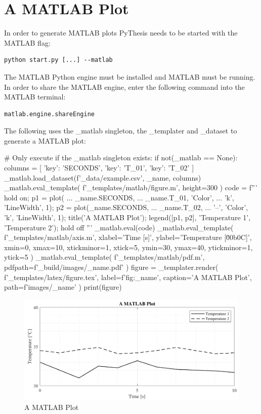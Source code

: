 \documentclass[a4paper]{book}
\begin{document}
\section{A MATLAB Plot}
\label{sec:a-matlab-plot}
In order to generate MATLAB plots PyThesis needs to be started with the MATLAB flag:
\begin{verbatim}
python start.py [...] --matlab
\end{verbatim}
The MATLAB Python engine must be installed and MATLAB must be running. In order to share the MATLAB engine, enter the following command into the MATLAB terminal:
\begin{verbatim}
matlab.engine.shareEngine
\end{verbatim}
The following uses the \_matlab singleton, the \_templater and \_dataset to generate a MATLAB plot:  
\begin{python}
# Only execute if the _matlab singleton exists:
if not(_matlab == None):
    columns = [
        {'key': 'SECONDS'},
        {'key': 'T_01'},
        {'key': 'T_02'}
    ]
    _matlab.load_dataset(f'{_data}/example.csv', _name, columns)
    _matlab.eval_template(
        f'{_templates}/matlab/figure.m',
        height=300
    )
    code = f'''
        hold on;
        p1 = plot( ...
            {_name}.SECONDS, ...
            {_name}.T_01, 'Color',  ...
            'k', 'LineWidth', 1);
        p2 = plot({_name}.SECONDS, ...
            {_name}.T_02, ...
            '--', 'Color', 'k', 'LineWidth', 1);
        title('A MATLAB Plot');
        legend([p1, p2], 'Temperature 1', 'Temperature 2');
        hold off
    '''
    _matlab.eval(code)
    _matlab.eval_template(
        f'{_templates}/matlab/axis.m',
        xlabel='Time [s]',
        ylabel='Temperature [\u00b0C]',
        xmin=0,
        xmax=10,
        xtickminor=1,
        xtick=5,
        ymin=30,
        ymax=40,
        ytickminor=1,
        ytick=5
    )
    _matlab.eval_template(
        f'{_templates}/matlab/pdf.m',
        pdfpath=f'{_build}/images/{_name}.pdf'
    )
figure = _templater.render(
    f'{_templates}/latex/figure.tex',
    label=f'fig:{_name}',
    caption='A MATLAB Plot',
    path=f'images/{_name}'
)
print(figure)

\end{python}
\begin{figure}[H]
\begin{center}
  \includegraphics[width=\textwidth]{images/a_matlab_plot}
  \caption{A MATLAB Plot}
  \label{fig:a_matlab_plot}
\end{center}
\end{figure}
\end{document}
